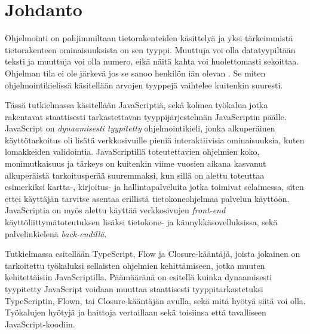 \chapter{Johdanto} \label{Johdanto}

Ohjelmointi on pohjimmiltaan tietorakenteiden käsittelyä ja yksi tärkeimmistä
tietorakenteen ominaisuuksista on sen tyyppi. Muuttuja  voi olla
datatyypiltään teksti ja muuttuja  voi olla numero, eikä näitä kahta voi
huolettomasti sekoittaa. Ohjelman tila ei ole järkevä jos se sanoo henkilön
iän olevan . Se miten ohjelmointikielissä käsitellään arvojen tyyppejä
vaihtelee kuitenkin suuresti.

Tässä tutkielmassa käsitellään JavaScriptiä, sekä kolmea työkalua jotka
rakentavat staattisesti tarkastettavan tyyppijärjestelmän
JavaScriptin päälle. JavaScript on \textit{dynaamisesti tyypitetty} ohjelmointikieli,
jonka alkuperäinen käyttötarkoitus oli lisätä verkkosivuille pieniä
interaktiivisia ominaisuuksia, kuten lomakkeiden validointia. JavaScriptillä
toteutettavien ohjelmien koko, monimutkaisuus ja tärkeys on kuitenkin viime
vuosien aikana kasvanut alkuperäistä tarkoitusperää suuremmaksi, kun sillä on
alettu toteuttaa esimerkiksi kartta-, kirjoitus- ja hallintapalveluita jotka
toimivat selaimessa, siten ettei käyttäjän tarvitse asentaa erillistä
tietokoneohjelmaa palvelun käyttöön. JavaScriptia on myös alettu käyttää
verkkosivujen \textit{front-end} käyt\-tö\-liit\-ty\-mä\-to\-teu\-tuk\-sen
lisäksi tietokone- ja kän\-nyk\-kä\-so\-vel\-luk\-sis\-sa, sekä
pal\-ve\-lin\-kie\-le\-nä \textit{back-endillä}.

Tutkielmassa esitellään TypeScript, Flow ja Closure-kääntäjä, joista jokainen on
tarkoitettu työkaluksi sellaisten ohjelmien kehittämiseen,
jotka muuten kehitettäisiin\newline
JavaScriptilla. Päämääränä on esitellä kuinka dynaamisesti
tyypitetty JavaScript voidaan muuttaa staattisesti tyyppitarkastetuksi
TypeScriptin, Flown, tai Closure-kääntäjän avulla, sekä mitä hyötyä siitä voi
olla. Työkalujen hyötyjä ja haittoja vertaillaan sekä toisiinsa että
tavalliseen JavaScript-koodiin.
